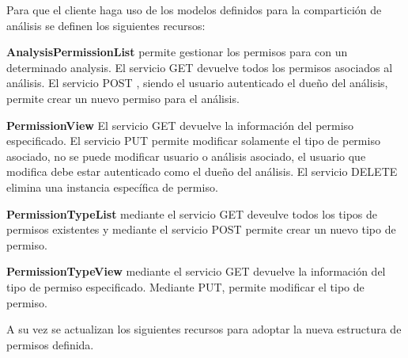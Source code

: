 Para que el cliente haga uso de los modelos definidos para la compartición de análisis se definen los siguientes recursos:

\textbf{AnalysisPermissionList} permite gestionar los permisos para con un determinado analysis. El servicio GET devuelve todos los permisos asociados al análisis. El servicio POST , siendo el usuario autenticado el dueño del análisis, permite crear un nuevo permiso para el análisis.

\textbf{PermissionView} El servicio GET devuelve la información del permiso especificado. El servicio PUT permite modificar solamente el tipo de permiso asociado, no se puede modificar usuario o análisis asociado, el usuario que modifica debe estar autenticado como el dueño del análisis. El servicio DELETE elimina una instancia específica de permiso.

\textbf{PermissionTypeList} mediante el servicio GET deveulve todos los tipos de permisos existentes y mediante el servicio POST permite crear un nuevo tipo de permiso.

\textbf{PermissionTypeView} mediante el servicio GET devuelve la información del tipo de permiso especificado. Mediante PUT, permite modificar el tipo de permiso.

A su vez se actualizan los siguientes recursos para adoptar la nueva estructura de permisos definida.

